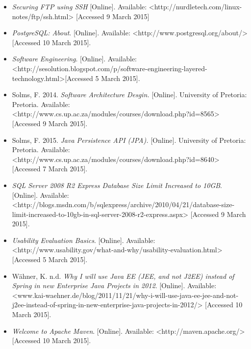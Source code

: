\documentclass[a4paper,12pt]{article}
\begin{document}
\begin{itemize}
			\item \textit{Securing FTP using SSH} [Online]. Available: <http://nurdletech.com/linux-notes/ftp/ssh.html> [Accessed 9 March 2015]

			\item \textit{PostgreSQL: About}. [Online]. Available: <http://www.postgresql.org/about/> [Accessed 10 March 2015].
			
			\item \textit{Software Engineering}. [Online]. Available: <http://sesolution.blogspot.com/p/software-engineering-layered-technology.html>[Accessed 5 March 2015].
								
			\item Solms, F. 2014. \textit{Software Architecture Desgin.} [Online]. University of Pretoria: Pretoria. Available: <http://www.cs.up.ac.za/modules/courses/download.php?id=8565> [Accessed 9 March 2015].
			
			\item Solms, F. 2015. \textit{Java Persistence API (JPA).} [Online]. University of Pretoria: Pretoria. Available: <http://www.cs.up.ac.za/modules/courses/download.php?id=8640> [Accessed 7 March 2015].
			
			\item \textit{SQL Server 2008 R2 Express Database Size Limit Increased to 10GB}. [Online]. Available: <http://blogs.msdn.com/b/sqlexpress/archive/2010/04/21/database-size-limit-increased-to-10gb-in-sql-server-2008-r2-express.aspx> [Accessed 9 March 2015].
			
			\item \textit{Usability Evaluation Basics}. [Online]. Available: <http://www.usability.gov/what-and-why/usability-evaluation.html> [Accessed 5 March 2015].

			\item Wähner, K. n.d. \textit{Why I will use Java EE (JEE, and not J2EE) instead of Spring in new Enterprise Java Projects in 2012}. [Online]. Available: <www.kai-waehner.de/blog/2011/11/21/why-i-will-use-java-ee-jee-and-not-j2ee-instead-of-spring-in-new-enterprise-java-projects-in-2012/> [Accessed 10 March 2015].		

			\item \textit{Welcome to Apache Maven}. [Online]. Available: <http://maven.apache.org/> [Accessed 10 March 2015].
			
			

			

		\end{itemize}
\end{document}
